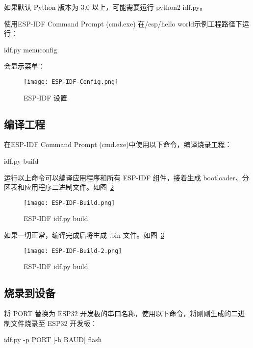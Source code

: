 如果默认 Python 版本为 3.0 以上，可能需要运行 python2 idf.py。


使用ESP-IDF Command Prompt (cmd.exe) 在/esp/hello world示例工程路径下运行：

\begin{tcolorbox}
    idf.py menuconfig
\end{tcolorbox}

会显示菜单：

\begin{figure}[htbp]
    \centering
    \texttt{[image: ESP-IDF-Config.png]}
    \caption{ESP-IDF 设置}
    \label{ESP-IDF-Config}
\end{figure}

\subsection{编译工程}

在ESP-IDF Command Prompt (cmd.exe)中使用以下命令，编译烧录工程：

\begin{tcolorbox}
    idf.py build
\end{tcolorbox}

运行以上命令可以编译应用程序和所有 ESP-IDF 组件，接着生成 bootloader、分区表和应用程序二进制文件。如图~\ref{fig:ESP-IDF-Build}

\begin{figure}[htbp]
    \centering
    \texttt{[image: ESP-IDF-Build.png]}
    \caption{ESP-IDF idf.py build}
    \label{fig:ESP-IDF-Build}
\end{figure}

如果一切正常，编译完成后将生成 .bin 文件。如图~\ref{fig:ESP-IDF-Build-2}

\begin{figure}[htbp]
    \centering
    \texttt{[image: ESP-IDF-Build-2.png]}
    \caption{ESP-IDF idf.py build}
    \label{fig:ESP-IDF-Build-2}
\end{figure}

\subsection{烧录到设备}

将 PORT 替换为 ESP32 开发板的串口名称，使用以下命令，将刚刚生成的二进制文件烧录至 ESP32 开发板：

\begin{tcolorbox}
    idf.py -p PORT [-b BAUD] flash
\end{tcolorbox}

